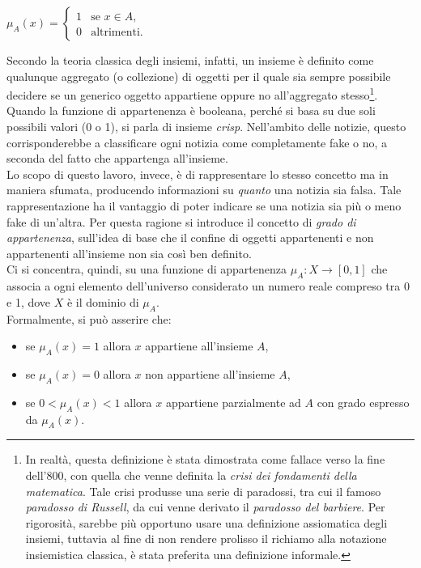 \documentclass[12pt]{report}
\theoremstyle{definition}
\begin{document}
\begin{center}
    $\mu_A(x)= \begin{cases} 1 & \mbox{se } x \in A, \\ 0 & \mbox{altrimenti.} \end{cases}$
\end{center}
Secondo la teoria classica degli insiemi, infatti, un insieme è definito come qualunque aggregato (o collezione) di oggetti per il quale sia sempre possibile decidere se un generico oggetto appartiene oppure no all'aggregato stesso\footnote{In realtà, questa definizione è stata dimostrata come fallace verso la fine dell'800, con quella che venne definita la \textit{crisi dei fondamenti della matematica}. Tale crisi produsse una serie di paradossi, tra cui il famoso \textit{paradosso di Russell}, da cui venne derivato il \textit{paradosso del barbiere}. Per rigorosità, sarebbe più opportuno usare una definizione assiomatica degli insiemi, tuttavia al fine di non rendere prolisso il richiamo alla notazione insiemistica classica, è stata preferita una definizione informale.}.
\\
Quando la funzione di appartenenza è booleana, perché si basa su due soli possibili valori (0 o 1), si parla di insieme \textit{crisp}. Nell'ambito delle notizie, questo corrisponderebbe a classificare ogni notizia come completamente fake o no, a seconda del fatto che appartenga all'insieme.
\\
Lo scopo di questo lavoro, invece, è di rappresentare lo stesso concetto ma in maniera sfumata, producendo informazioni su \textit{quanto} una notizia sia falsa.
Tale rappresentazione ha il vantaggio di poter indicare se una notizia sia più o meno fake di un'altra.
Per questa ragione si introduce il concetto di \textit{grado di appartenenza}, sull'idea di base che il confine di oggetti appartenenti e non appartenenti all'insieme non sia così ben definito.
\\
Ci si concentra, quindi, su una funzione di appartenenza $\mu_A: X \rightarrow [0,1]$ che associa a ogni elemento dell'universo considerato un numero reale compreso tra 0 e 1, dove $X$ è il dominio di $\mu_A$.
\\
Formalmente, si può asserire che:
\begin{itemize}
    \item se $\mu_A(x) = 1$ allora $x$ appartiene all'insieme $A$,
    \item se $\mu_A(x) = 0$ allora $x$ non appartiene all'insieme $A$,
    \item se $0 < \mu_A(x) < 1$ allora $x$ appartiene parzialmente ad $A$ con grado espresso da $\mu_A(x)$.
\end{itemize}
\end{document}
